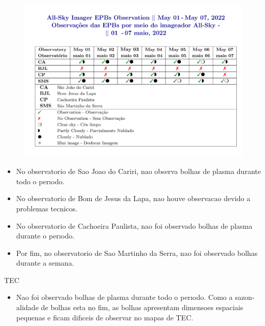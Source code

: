\documentclass[a4paper, 10pt]{article}
\begin{document}
\begin{figure}[H]
    
                        \centering
   
                             \includegraphics[width=14cm]{./figures//figureImager_0.png}

                        \end{figure}

                     \begin{itemize} 
 \item  No observatorio de Sao Joao do Cariri, nao observa bolhas de plasma durante todo o perıodo. 
\item  No observatorio de Bom de Jesus da Lapa, nao houve observacao devido a problemas tecnicos. 
\item  No observatorio de Cachoeira Paulista, nao foi observado bolhas de plasma durante o perıodo. 
\item  Por fim, no observatorio de Sao Martinho da Serra, nao foi observado bolhas durante a semana. 
\end{itemize} 
 TEC 
\begin{itemize} 
 \item  Nao foi observado bolhas de plasma durante todo o perıodo. Como a sazon- alidade de bolhas esta no fim, as bolhas apresentam dimensoes espaciais pequenas e ficam difıceis de observar no mapas de TEC. 
\end{itemize} 
 
\end{document}
